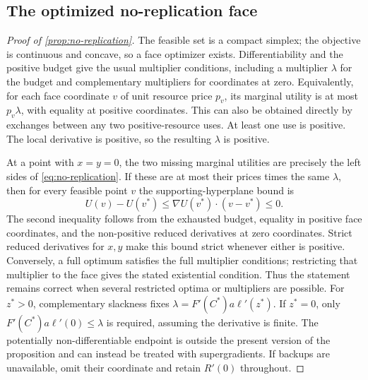 \documentclass[11pt,a4paper]{article}
\theoremstyle{definition}\newtheorem{definition}{Definition}
\begin{document}
\subsection{The optimized no-replication face}
\label{app:replication-proof}
\begin{proof}[Proof of \cref{prop:no-replication}]
The feasible set is a compact simplex; the objective is continuous and
concave, so a face optimizer exists. Differentiability and the positive
budget give the usual multiplier conditions, including a multiplier
$\lambda$ for the budget and complementary multipliers for coordinates
at zero. Equivalently, for each face coordinate $v$ of unit resource
price $p_v$, its marginal utility is at most $p_v\lambda$, with equality
at positive coordinates. This can also be obtained directly by exchanges
between any two positive-resource uses. At least one use is positive.
The local derivative is positive, so the resulting $\lambda$ is positive.

At a point with $x=y=0$, the two missing marginal utilities are precisely
the left sides of \cref{eq:no-replication}. If these are at most their
prices times the same $\lambda$, then for every feasible point $v$ the
supporting-hyperplane bound is
\[
 U(v)-U(v^*)\leq\nabla U(v^*)\cdot(v-v^*)\leq0.
\]
The second inequality follows from the exhausted budget, equality in
positive face coordinates, and the non-positive reduced derivatives at
zero coordinates. Strict reduced derivatives for $x,y$ make this bound
strict whenever either is positive. Conversely, a full optimum satisfies
the full multiplier conditions; restricting that multiplier to the face
gives the stated existential condition. Thus the statement remains
correct when several restricted optima or multipliers are possible.
For $z^*>0$, complementary slackness fixes
$\lambda=F'(C^*)a\ell'(z^*)$. If $z^*=0$, only
$F'(C^*)a\ell'(0)\leq\lambda$ is required, assuming the derivative is
finite. The potentially non-differentiable endpoint is outside the
present version of the proposition and can instead be treated with
supergradients. If backups are unavailable, omit their coordinate and
retain $R'(0)$ throughout.
\end{proof}
\end{document}
